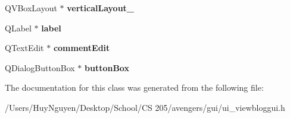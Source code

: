 \begin{DoxyCompactItemize}
\item 
Q\+V\+Box\+Layout $\ast$ {\bfseries vertical\+Layout\+\_}\hypertarget{classUi__ViewBlogGUI_af17d59ba9353598b9615c71b4a98c8b9}{}\label{classUi__ViewBlogGUI_af17d59ba9353598b9615c71b4a98c8b9}

\item 
Q\+Label $\ast$ {\bfseries label}\hypertarget{classUi__ViewBlogGUI_a302532ebe6a3881b37cf53317983dac7}{}\label{classUi__ViewBlogGUI_a302532ebe6a3881b37cf53317983dac7}

\item 
Q\+Text\+Edit $\ast$ {\bfseries comment\+Edit}\hypertarget{classUi__ViewBlogGUI_a4cc0386f2cce193bed0857536c71a2a0}{}\label{classUi__ViewBlogGUI_a4cc0386f2cce193bed0857536c71a2a0}

\item 
Q\+Dialog\+Button\+Box $\ast$ {\bfseries button\+Box}\hypertarget{classUi__ViewBlogGUI_a2f5bc19471b7f77ab1046d9f957ce4f3}{}\label{classUi__ViewBlogGUI_a2f5bc19471b7f77ab1046d9f957ce4f3}

\end{DoxyCompactItemize}


The documentation for this class was generated from the following file\+:\begin{DoxyCompactItemize}
\item 
/\+Users/\+Huy\+Nguyen/\+Desktop/\+School/\+C\+S 205/avengers/gui/ui\+\_\+viewbloggui.\+h\end{DoxyCompactItemize}
